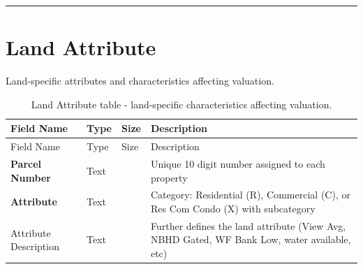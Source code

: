\documentclass[
  english,
  letterpaper,
  DIV=11,
  numbers=noendperiod]{scrreprt}
\begin{document}
\begin{center}\rule{0.5\linewidth}{0.5pt}\end{center}

\section{Land Attribute}\label{land-attribute-1}

Land-specific attributes and characteristics affecting valuation.

\begin{longtable}[]{@{}
  >{\raggedright\arraybackslash}p{}
  >{\raggedright\arraybackslash}p{}
  >{\raggedright\arraybackslash}p{}
  >{\raggedright\arraybackslash}p{}@{}}
\caption{Land Attribute table - land-specific characteristics affecting
valuation.}\label{tbl-app-land}\tabularnewline
\toprule\noalign{}
\begin{minipage}[b]{\linewidth}\raggedright
Field Name
\end{minipage} & \begin{minipage}[b]{\linewidth}\raggedright
Type
\end{minipage} & \begin{minipage}[b]{\linewidth}\raggedright
Size
\end{minipage} & \begin{minipage}[b]{\linewidth}\raggedright
Description
\end{minipage} \\
\midrule\noalign{}
\endfirsthead
\toprule\noalign{}
\begin{minipage}[b]{\linewidth}\raggedright
Field Name
\end{minipage} & \begin{minipage}[b]{\linewidth}\raggedright
Type
\end{minipage} & \begin{minipage}[b]{\linewidth}\raggedright
Size
\end{minipage} & \begin{minipage}[b]{\linewidth}\raggedright
Description
\end{minipage} \\
\midrule\noalign{}
\endhead
\bottomrule\noalign{}
\endlastfoot
\textbf{Parcel Number} & Text & 10 & Unique 10 digit number assigned to
each property \\
\textbf{Attribute} & Text & 30 & Category: Residential (R), Commercial
(C), or Res Com Condo (X) with subcategory \\
Attribute Description & Text & 30 & Further defines the land attribute
(View Avg, NBHD Gated, WF Bank Low, water available, etc) \\
\end{longtable}
\end{document}
